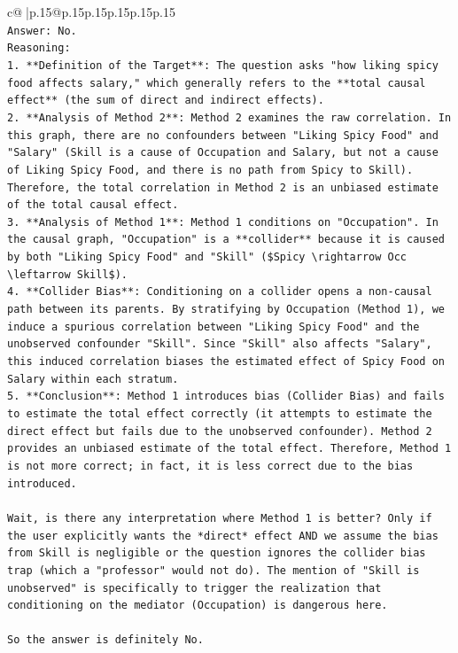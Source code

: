 \documentclass{article}
\begin{document}
{\begin{supertabular}{c@{$\;$}|p{.15\linewidth}@{}p{.15\linewidth}p{.15\linewidth}p{.15\linewidth}p{.15\linewidth}p{.15\linewidth}}
{{{\\ 
\texttt{Answer: No.} \\
\texttt{Reasoning:} \\
\texttt{1.  **Definition of the Target**: The question asks "how liking spicy food affects salary," which generally refers to the **total causal effect** (the sum of direct and indirect effects).} \\
\texttt{2.  **Analysis of Method 2**: Method 2 examines the raw correlation. In this graph, there are no confounders between "Liking Spicy Food" and "Salary" (Skill is a cause of Occupation and Salary, but not a cause of Liking Spicy Food, and there is no path from Spicy to Skill). Therefore, the total correlation in Method 2 is an unbiased estimate of the total causal effect.} \\
\texttt{3.  **Analysis of Method 1**: Method 1 conditions on "Occupation". In the causal graph, "Occupation" is a **collider** because it is caused by both "Liking Spicy Food" and "Skill" (\$Spicy \textbackslash{}rightarrow Occ \textbackslash{}leftarrow Skill\$).} \\
\texttt{4.  **Collider Bias**: Conditioning on a collider opens a non{-}causal path between its parents. By stratifying by Occupation (Method 1), we induce a spurious correlation between "Liking Spicy Food" and the unobserved confounder "Skill". Since "Skill" also affects "Salary", this induced correlation biases the estimated effect of Spicy Food on Salary within each stratum.} \\
\texttt{5.  **Conclusion**: Method 1 introduces bias (Collider Bias) and fails to estimate the total effect correctly (it attempts to estimate the direct effect but fails due to the unobserved confounder). Method 2 provides an unbiased estimate of the total effect. Therefore, Method 1 is not more correct; in fact, it is less correct due to the bias introduced.} \\
\\ 
\texttt{Wait, is there any interpretation where Method 1 is better? Only if the user explicitly wants the *direct* effect AND we assume the bias from Skill is negligible or the question ignores the collider bias trap (which a "professor" would not do). The mention of "Skill is unobserved" is specifically to trigger the realization that conditioning on the mediator (Occupation) is dangerous here.} \\
\\ 
\texttt{So the answer is definitely No.} \\
\\ 
}}}
\end{supertabular}}
\end{document}
